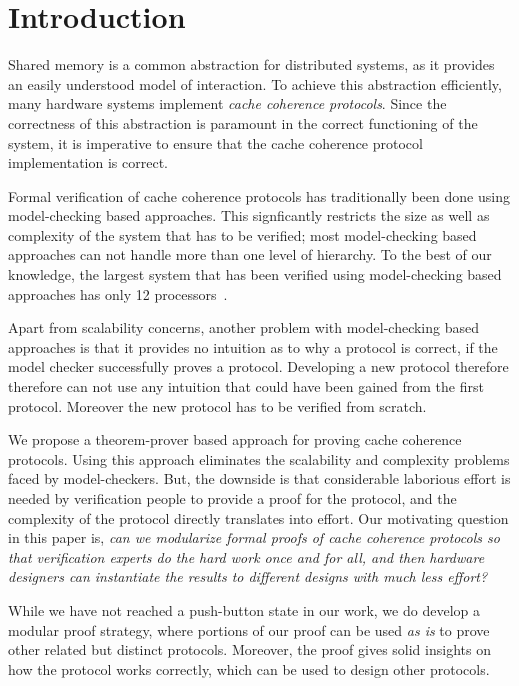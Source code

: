 \section{Introduction}
\label{sec:Introduction}

Shared memory is a common abstraction for distributed systems, as it provides
an easily understood model of interaction. To achieve this abstraction
efficiently, many hardware systems implement \emph{cache coherence protocols}.
Since the correctness of this abstraction is paramount in the correct
functioning of the system, it is imperative to ensure that the cache coherence
protocol implementation is correct.

Formal verification of cache coherence protocols has traditionally been done
using model-checking based approaches. This signficantly restricts the size as
well as complexity of the system that has to be verified; most model-checking
based approaches can not handle more than one level of hierarchy. To the best
of our knowledge, the largest system that has been verified using
model-checking based approaches has only 12 processors~\cite{Chen:2008:VHC:1559300}.

Apart from scalability concerns, another problem with model-checking based
approaches is that it provides no intuition as to why a protocol is correct, if
the model checker successfully proves a protocol. Developing a new protocol
therefore therefore can not use any intuition that could have been gained from
the first protocol. Moreover the new protocol has to be verified from scratch.

We propose a theorem-prover based approach for proving cache coherence
protocols. Using this approach eliminates the scalability and complexity
problems faced by model-checkers. But, the downside is that considerable
laborious effort is needed by verification people to provide a proof for the
protocol, and the complexity of the protocol directly translates into effort.
Our motivating question in this paper is,
\emph{can we modularize formal proofs of cache coherence protocols so that
verification experts do the hard work once and for all, and then hardware
designers can instantiate the results to different designs with much less
effort?}

While we have not reached a push-button state in our work, we do develop a
modular proof strategy, where portions of our proof can be used \emph{as is} to
prove other related but distinct protocols. Moreover, the proof gives solid
insights on how the protocol works correctly, which can be used to design other
protocols.


